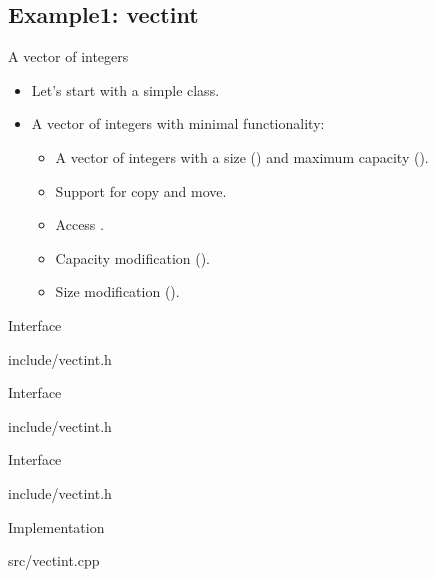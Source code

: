\subsection{Example1: vectint}

\begin{frame}[t]{A vector of integers}
\begin{itemize}
  \item Let's start with a simple class.
  \item A vector of integers with minimal functionality:
    \begin{itemize}
      \item A vector of integers with a size () 
            and maximum capacity ().
      \item Support for copy and move.
      \item Access .
      \item Capacity modification (). 
      \item Size modification (). 
    \end{itemize}
\end{itemize}
\end{frame}

\begin{frame}[t]{Interface}
\begin{block}{include/vectint.h}

\end{block}
\end{frame}

\begin{frame}[t]{Interface}
\begin{block}{include/vectint.h}

\end{block}
\end{frame}

\begin{frame}[t]{Interface}
\begin{block}{include/vectint.h}

\end{block}
\end{frame}

\begin{frame}[t]{Implementation}
\begin{block}{src/vectint.cpp}

\end{block}
\end{frame}

